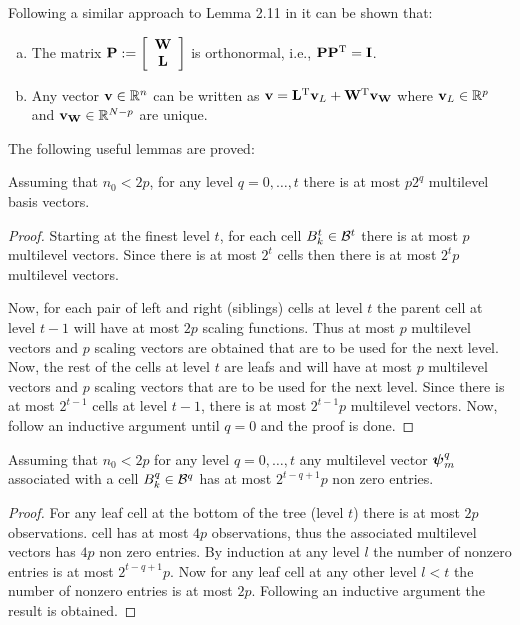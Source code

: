 \documentclass[11pt,final]{amsart}       %
\begin{document}
Following a similar approach to Lemma 2.11 in \cite{Castrillon2013} it
can be shown that:
\begin{enumerate}[a)]
\item 
The matrix $\mathbf{P} := \left[
\begin{array}{c}
\mathbf{W} \\
\mathbf{L}
\end{array}
\right ]$ is orthonormal, i.e., $\mathbf{P}\mathbf{P}^{\rm T}= \mathbf{I}$.

\item Any vector $\mathbf{v}
\in \Bbb{R}^{n}$ can be written as $\mathbf{v} = \mathbf{L}^{\rm T}\mathbf{v}_{L} + \mathbf{W}^{\rm T}\mathbf{v}_{\mathbf{W}}$
where $\mathbf{v}_{L} \in \Bbb{R}^{p} $ and $\mathbf{v}_{\mathbf{W}} \in \Bbb{R}^{N-p}$ are unique.

\end{enumerate}





The following useful lemmas are proved:
\begin{lemma} Assuming that $n_0 < 2p$,
for any level $q=0,\dots,t$ there is at most $p2^{q}$ multilevel
basis vectors.
\label{MultilevelREML:lemma1}
\end{lemma}
\begin{proof}
Starting at the finest level $t$, for each cell $B^{t}_k \in {\mathcal B}^{t}$
there is at most $p$ multilevel vectors.  Since there is at most
$2^t$ cells then there is at most $2^{t} p$ multilevel vectors.

Now, for each pair of left and right (siblings) cells at level $t$ the
parent cell at level $t-1$ will have at most $2 p$ scaling
functions. Thus at most $p$ multilevel vectors and $p$ scaling
vectors are obtained that are to be used for the next level. Now, the
rest of the cells at level $t$ are leafs and will have at most $p$
multilevel vectors and $p$ scaling vectors that are to be used for
the next level. Since there is at most $2^{t-1}$ cells at level $t-1$,
there is at most $2^{t-1} p$ multilevel vectors. Now, follow an
inductive argument until $q = 0$ and the proof is done.
\end{proof}



\begin{lemma} Assuming that $n_0 < 2p$ for any level $q = 0, \dots, t$
  any multilevel vector $\boldsymbol{\psi}^{q}_m$ associated with a cell $B^{q}_k
  \in {\mathcal B}^{q}$ has at most $2^{t-q+1} p$ non zero entries.
\label{MultilevelREML:lemma2}
\end{lemma}
\begin{proof} For any leaf cell at the bottom of the tree (level $t$)
  there is at most $2 p$ observations.
  cell has at most $4 p$ observations, thus the associated multilevel
  vectors has $4p$ non zero entries. By induction at any level $l$ the
  number of nonzero entries is at most $2^{t-q+1} p$.  Now for any
  leaf cell at any other level $l < t$ the number of nonzero entries
  is at most $2 p$. Following an inductive argument the result is
  obtained.
\end{proof}
\end{document}
